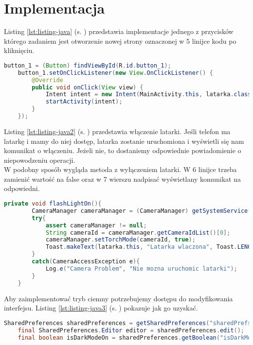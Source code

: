 	\newpage
\section{Implementacja}		%


Listing \ref{lst:listing-java} (s. \pageref{lst:listing-java}) przedstawia implementacje jednego z przycisków którego zadaniem jest otworzenie nowej strony oznaczonej w 5 linijce kodu po kliknięciu. 
\begin{lstlisting}[caption=Menu - Działanie Przycisków, label={lst:listing-java}, language=Java]
	button_1 = (Button) findViewById(R.id.button_1);
	button_1.setOnClickListener(new View.OnClickListener() {
		@Override
		public void onClick(View view) {
			Intent intent = new Intent(MainActivity.this, latarka.class);
			startActivity(intent);
		}
	});
\end{lstlisting}


Listing \ref{lst:listing-java2} (s. \pageref{lst:listing-java2}) przedstawia włączenie latarki. Jeśli telefon ma latarkę i mamy do niej dostęp, latarka zostanie uruchomiona i wyświetli się nam komunikat o włączeniu. Jeżeli nie, to dostaniemy odpowiednie powiadomienie o niepowodzeniu operacji. \\
W podobny sposób wygląda metoda z wyłączeniem latarki. W 6 linijce trzeba zamienić wartość na false oraz w 7 wierszu nadpisać wyświetlany komunikat na odpowiedni.
\begin{lstlisting}[caption=Latarka - Włączenie/wyłączenie latarki, label={lst:listing-java2}, language=Java]
	private void flashLightOn(){
		CameraManager cameraManager = (CameraManager) getSystemService(Context.CAMERA_SERVICE);
		try{
			assert cameraManager != null;
			String cameraId = cameraManager.getCameraIdList()[0];
			cameraManager.setTorchMode(cameraId, true);
			Toast.makeText(latarka.this, "Latarka wlaczona", Toast.LENGTH_SHORT).show();
		}
		catch(CameraAccessException e){
			Log.e("Camera Problem", "Nie mozna uruchomic latarki");
		}
	}
\end{lstlisting}

\newpage


Aby zaimplementować tryb ciemny potrzebujemy dostępu do modyfikowania interfejsu. Listing \ref{lst:listing-java3} (s. \pageref{lst:listing-java3}) pokazuje jak go uzyskać. 
\begin{lstlisting}[caption=Tryb Ciemny - Modyfikowanie interfejsu, label={lst:listing-java3}, language=Java]
	SharedPreferences sharedPreferences = getSharedPreferences("sharedPrefs", MODE_PRIVATE);
	final SharedPreferences.Editor editor = sharedPreferences.edit();
	final boolean isDarkModeOn = sharedPreferences.getBoolean("isDarkModeOn", false);
\end{lstlisting}


